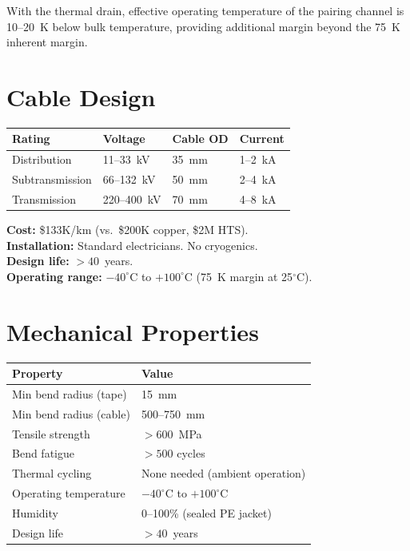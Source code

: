 \documentclass[11pt, a4paper]{article}
\begin{document}
With the thermal drain, effective operating temperature of the
pairing channel is 10--20~K below bulk temperature, providing
additional margin beyond the 75~K inherent margin.

\section{Cable Design}

\begin{center}
\begin{tabular}{@{}llll@{}}
\toprule
\textbf{Rating} & \textbf{Voltage} & \textbf{Cable OD} &
  \textbf{Current} \\
\midrule
Distribution & 11--33~kV & 35~mm & 1--2~kA \\
Subtransmission & 66--132~kV & 50~mm & 2--4~kA \\
Transmission & 220--400~kV & 70~mm & 4--8~kA \\
\bottomrule
\end{tabular}
\end{center}

\textbf{Cost:} \$133K/km (vs.\ \$200K copper, \$2M HTS). \\
\textbf{Installation:} Standard electricians. No cryogenics. \\
\textbf{Design life:} $> 40$~years. \\
\textbf{Operating range:} $-40^\circ$C to $+100^\circ$C
(75~K margin at 25$^\circ$C).

\section{Mechanical Properties}

\begin{center}
\begin{tabular}{@{}ll@{}}
\toprule
\textbf{Property} & \textbf{Value} \\
\midrule
Min bend radius (tape) & 15~mm \\
Min bend radius (cable) & 500--750~mm \\
Tensile strength & $> 600$~MPa \\
Bend fatigue & $> 500$ cycles \\
Thermal cycling & None needed (ambient operation) \\
Operating temperature & $-40^\circ$C to $+100^\circ$C \\
Humidity & 0--100\% (sealed PE jacket) \\
Design life & $> 40$~years \\
\bottomrule
\end{tabular}
\end{center}
\end{document}

